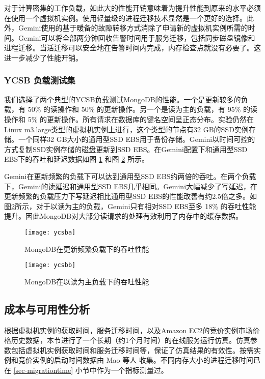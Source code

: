 对于计算密集的工作负载，如此大的性能开销意味着为提升性能到原来的水平必须在使用一个虚拟机实例。使用轻量级的进程迁移技术显然是一个更好的选择。此外，Gemini使用的基于暖备的故障转移方式消除了申请新的虚拟机实例所需的时间。Gemini可以将全部两分钟回收告警时间用于服务迁移，包括同步磁盘镜像和进程迁移。当活迁移可以安全地在告警时间内完成，内存检查点就没有必要了。这进一步减少了性能开销。

\subsubsection{YCSB 负载测试集}
我们选择了两个典型的YCSB负载测试MongoDB的性能。一个是更新较多的负载，有 50\% 的读操作和 50\% 的更新操作。另一个是读为主的负载，有 95\% 的读操作和 5\% 的更新操作。所有请求在数据库的键名空间呈正态分布。实验仍然在Linux m3.large类型的虚拟机实例上进行，这个类型的节点有32 GB的SSD实例存储。一个同样32 GB大小的通用型SSD EBS用于备份存储。Gemini以时间可控的方式复制SSD实例存储的磁盘更新到SSD EBS。在Gemini配置下和通用型SSD EBS下的吞吐和延迟数据如图 \ref{figure:ycsba} 和图 \ref{figure:ycsbb} 所示。

Gemini在更新频繁的负载下可以达到通用型SSD EBS约两倍的吞吐。在两个负载下，Gemini的读延迟和通用型SSD EBS几乎相同。Gemini大幅减少了写延迟，在更新频繁的负载压力下写延迟相比通用型SSD EBS的性能改善有约2.5倍之多。如图\ref{figure:ycsbb}所示，对于以读为主的负载，Gemini只有相对SSD EBS至多 18\% 的吞吐性能提升。因此MongoDB对大部分读请求的处理有效利用了内存中的缓存数据。

\begin{figure}[]
  \centering
  \texttt{[image: ycsba]}
  \caption{MongoDB在更新频繁负载下的吞吐性能}
  \label{figure:ycsba}
\end{figure}

\begin{figure}[]
  \centering
  \texttt{[image: ycsbb]}
  \caption{MongoDB在以读为主负载下的吞吐性能}
  \label{figure:ycsbb}
\end{figure}

\subsection{成本与可用性分析}
根据虚拟机实例的获取时间，服务迁移时间，以及Amazon EC2的竞价实例市场价格历史数据，本节进行了一个长期（约1个月时间）的在线服务运行仿真。仿真参数包括虚拟机实例获取时间和服务迁移时间等，保证了仿真结果的有效性。按需实例和竞价实例的启动时间数据由 Mao 等人 \cite{Mao:2012:PSV:2353730.2353859} 收集。不同内存大小的进程迁移时间已在 \ref{sec-migrationtime} 小节中作为一个指标测量过。

